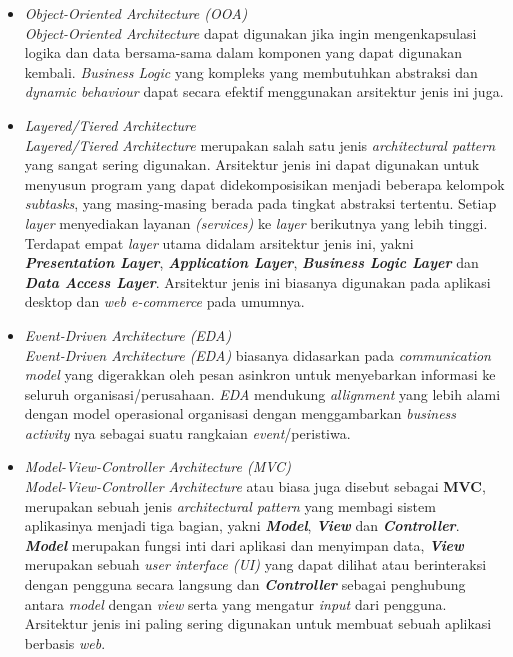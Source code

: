 \documentclass[a4paper]{article}
\begin{document}
\begin{itemize}
    \item \textit{Object-Oriented Architecture (OOA)}\\
          \textit{Object-Oriented Architecture} dapat digunakan jika ingin mengenkapsulasi logika dan data bersama-sama dalam komponen yang dapat digunakan kembali. \textit{Business Logic} yang kompleks yang membutuhkan abstraksi dan \textit{dynamic behaviour} dapat secara efektif menggunakan arsitektur jenis ini juga\autocite{architectural-pattern}.
    \item \textit{Layered/Tiered Architecture}\\
          \textit{Layered/Tiered Architecture} merupakan salah satu jenis \textit{architectural pattern} yang sangat sering digunakan\autocite{architectural-pattern}. Arsitektur jenis ini dapat digunakan untuk menyusun program yang dapat didekomposisikan menjadi beberapa kelompok \textit{subtasks}, yang masing-masing berada pada tingkat abstraksi tertentu. Setiap \textit{layer} menyediakan layanan \textit{(services)} ke \textit{layer} berikutnya yang lebih tinggi. Terdapat empat \textit{layer} utama didalam arsitektur jenis ini, yakni \textbf{\textit{Presentation Layer}}, \textbf{\textit{Application Layer}}, \textbf{\textit{Business Logic Layer}} dan \textbf{\textit{Data Access Layer}}. Arsitektur jenis ini biasanya digunakan pada aplikasi desktop dan \textit{web e-commerce} pada umumnya\autocite{archi-pattern}.
    \item \textit{Event-Driven Architecture (EDA)}\\
          \textit{Event-Driven Architecture (EDA)} biasanya didasarkan pada \textit{communication model} yang digerakkan oleh pesan asinkron untuk menyebarkan informasi ke seluruh organisasi/perusahaan. \textit{EDA} mendukung \textit{allignment} yang lebih alami dengan model operasional organisasi dengan menggambarkan \textit{business activity} nya sebagai suatu rangkaian \textit{event}/peristiwa\autocite{architectural-pattern}.
    \item \textit{Model-View-Controller Architecture (MVC)}\\
          \textit{Model-View-Controller Architecture} atau biasa juga disebut sebagai \textbf{MVC}, merupakan sebuah jenis \textit{architectural pattern} yang membagi sistem aplikasinya menjadi tiga bagian, yakni \textbf{\textit{Model}}, \textbf{\textit{View}} dan \textbf{\textit{Controller}}. \textbf{\textit{Model}} merupakan fungsi inti dari aplikasi dan menyimpan data, \textbf{\textit{View}} merupakan sebuah \textit{user interface (UI)} yang dapat dilihat atau berinteraksi dengan pengguna secara langsung dan \textbf{\textit{Controller}} sebagai penghubung antara \textit{model} dengan \textit{view} serta yang mengatur \textit{input} dari pengguna. Arsitektur jenis ini paling sering digunakan untuk membuat sebuah aplikasi berbasis \textit{web}\autocite{archi-pattern}.
\end{itemize}
\end{document}
